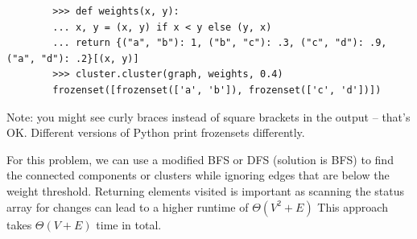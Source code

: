 \begin{progprob}
    \begin{verbatim}
        >>> def weights(x, y):
        ... x, y = (x, y) if x < y else (y, x)
        ... return {("a", "b"): 1, ("b", "c"): .3, ("c", "d"): .9, ("a", "d"): .2}[(x, y)]
        >>> cluster.cluster(graph, weights, 0.4)
        frozenset([frozenset(['a', 'b']), frozenset(['c', 'd'])])
    \end{verbatim}

    Note: you might see curly braces instead of square brackets in the output -- that's OK.
    Different versions of Python print frozensets differently.

    \begin{soln}
        For this problem, we can use a modified BFS or DFS (solution
        is BFS) to find the connected components or clusters while
        ignoring edges that are below the weight threshold. Returning
        elements visited is important as scanning the status array
        for changes can lead to a higher runtime of $\Theta(V^2 + E)$
        This approach takes $\Theta(V + E)$ time in total.

        \inputminted{python}{\thisdir/include-solution/cluster.py}
   \end{soln}

\end{progprob}
